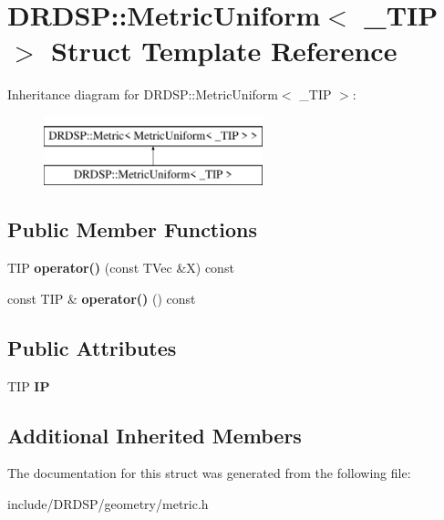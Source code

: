 \hypertarget{struct_d_r_d_s_p_1_1_metric_uniform}{\section{D\-R\-D\-S\-P\-:\-:Metric\-Uniform$<$ \-\_\-\-T\-I\-P $>$ Struct Template Reference}
\label{struct_d_r_d_s_p_1_1_metric_uniform}
}
Inheritance diagram for D\-R\-D\-S\-P\-:\-:Metric\-Uniform$<$ \-\_\-\-T\-I\-P $>$\-:\begin{figure}[H]
\begin{center}
\leavevmode
\includegraphics[height=2.000000cm]{struct_d_r_d_s_p_1_1_metric_uniform}
\end{center}
\end{figure}
\subsection*{Public Member Functions}
\begin{DoxyCompactItemize}
\item 
\hypertarget{struct_d_r_d_s_p_1_1_metric_uniform_a30c3e100ba28959007af2d2967e61e29}{T\-I\-P {\bfseries operator()} (const T\-Vec \&X) const }\label{struct_d_r_d_s_p_1_1_metric_uniform_a30c3e100ba28959007af2d2967e61e29}

\item 
\hypertarget{struct_d_r_d_s_p_1_1_metric_uniform_a49c7413ee783f5971f7c6c6da69fdd0f}{const T\-I\-P \& {\bfseries operator()} () const }\label{struct_d_r_d_s_p_1_1_metric_uniform_a49c7413ee783f5971f7c6c6da69fdd0f}

\end{DoxyCompactItemize}
\subsection*{Public Attributes}
\begin{DoxyCompactItemize}
\item 
\hypertarget{struct_d_r_d_s_p_1_1_metric_uniform_aaec3c0874b685ac42954f81d8d6d4dee}{T\-I\-P {\bfseries I\-P}}\label{struct_d_r_d_s_p_1_1_metric_uniform_aaec3c0874b685ac42954f81d8d6d4dee}

\end{DoxyCompactItemize}
\subsection*{Additional Inherited Members}


The documentation for this struct was generated from the following file\-:\begin{DoxyCompactItemize}
\item 
include/\-D\-R\-D\-S\-P/geometry/metric.\-h\end{DoxyCompactItemize}
